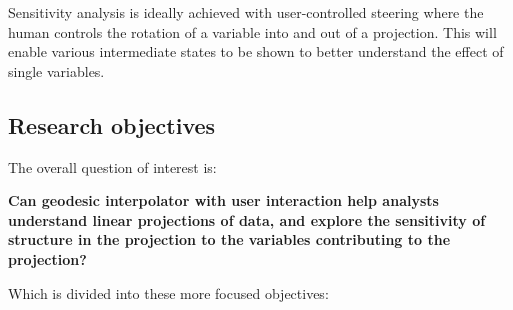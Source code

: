 \documentclass[
  11,
]{article}
\begin{document}
Sensitivity analysis is ideally achieved with user-controlled steering where the human controls the rotation of a variable into and out of a projection. This will enable various intermediate states to be shown to better understand the effect of single variables.

\hypertarget{research-objectives}{%
\subsection{Research objectives}\label{research-objectives}}

The overall question of interest is:

\textbf{Can geodesic interpolator with user interaction help analysts understand linear projections of data, and explore the sensitivity of structure in the projection to the variables contributing to the projection?}

Which is divided into these more focused objectives:
\end{document}

